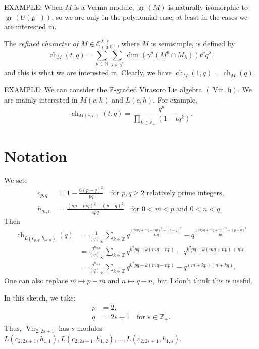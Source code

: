 \documentclass[a4paper, 12pt, reqno]{amsart}
\DeclareMathOperator{\Vir}{Vir}
\DeclareMathOperator{\ch}{ch}
\DeclareMathOperator{\gr}{gr}
\begin{document}
EXAMPLE: When $M$ is a Verma module, $\gr(M)$ is naturally isomorphic to $\gr(U(\mathfrak{g}^-))$, so we are only in the polynomial case, at least in the cases we are interested in.

The \emph{refined character of $M \in \mathcal{C}^{\lambda \ge}_{(\mathfrak{g}, \mathfrak{h})}$}, where $M$ is semisimple, is defined by
\begin{equation*}
  \ch_M(t, q) = \sum_{p \in \mathbb{N}}\sum_{\lambda \in \mathfrak{h}^*}\dim(\gamma^p(M^p \cap M_{\lambda}))t^pq^{\lambda},
\end{equation*}
and this is what we are interested in.
Clearly, we have $\ch_M(1, q) = \ch_M(q)$.

EXAMPLE: We can consider the $\mathbb{Z}$-graded Virasoro Lie algebra $(\Vir, \mathfrak{h})$.
We are mainly interested in $M(c, h)$ and $L(c, h)$.
For example,
\begin{equation*}
  \ch_{M(c, h)}(t, q) = \frac{q^h}{\prod_{k \in \mathbb{Z}_+}(1 - tq^k)}.
\end{equation*}

\section{Notation}
\label{sec:notation}

We set:
\begin{align*}
  c_{p, q} &= 1 - \frac{6(p - q)^2}{pq} \quad \text{for $p, q \ge 2$ relatively prime integers}, \\
  h_{m, n} &= \frac{(np - mq)^2 - (p - q)^2}{4pq} \quad \text{for $0 < m < p$ and $0 < n < q$.}
\end{align*}
Then
\begin{align*}
  \ch_{L(c_{p, q}, h_{m, n})}(q) &= \frac{1}{(q)_{\infty}}\sum_{k \in \mathbb{Z}}q^{\frac{(2kpq + mq - np)^2 - (p - q)^2}{4pq}} - q^{\frac{(2kpq + mq + np)^2 - (p - q)^2}{4pq}} \\
                                 &= \frac{q^{h_{m, n}}}{(q)_{\infty}}\sum_{k \in \mathbb{Z}}q^{k^2pq + k(mq - np)}-q^{k^2pq + k(mq + np) + mn} \\
                                 &= \frac{q^{h_{m, n}}}{(q)_{\infty}}\sum_{k \in \mathbb{Z}}q^{k^2pq + k(mq - np)}-q^{(m + kp)(n + kq)}.
\end{align*}
One can also replace $m \mapsto p - m$ and $n \mapsto q - n$, but I don't think this is useful.

In this sketch, we take:
\begin{align*}
  p &= 2, \\
  q &= 2s + 1 \quad \text{for $s \in \mathbb{Z}_+$}.
\end{align*}
Thus, $\Vir_{2, 2s + 1}$ has $s$ modules $L(c_{2, 2s + 1}, h_{1, 1}), L(c_{2, 2s + 1}, h_{1, 2}), \dots, L(c_{2, 2s + 1}, h_{1, s})$.
\end{document}
